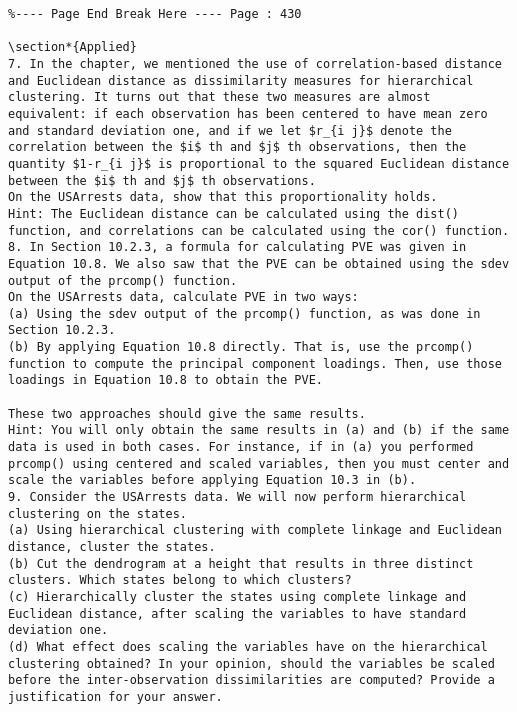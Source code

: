 \documentclass[10pt]{article}
\begin{document}
\begin{verbatim}
%---- Page End Break Here ---- Page : 430

\section*{Applied}
7. In the chapter, we mentioned the use of correlation-based distance and Euclidean distance as dissimilarity measures for hierarchical clustering. It turns out that these two measures are almost equivalent: if each observation has been centered to have mean zero and standard deviation one, and if we let $r_{i j}$ denote the correlation between the $i$ th and $j$ th observations, then the quantity $1-r_{i j}$ is proportional to the squared Euclidean distance between the $i$ th and $j$ th observations.
On the USArrests data, show that this proportionality holds.
Hint: The Euclidean distance can be calculated using the dist() function, and correlations can be calculated using the cor() function.
8. In Section 10.2.3, a formula for calculating PVE was given in Equation 10.8. We also saw that the PVE can be obtained using the sdev output of the prcomp() function.
On the USArrests data, calculate PVE in two ways:
(a) Using the sdev output of the prcomp() function, as was done in Section 10.2.3.
(b) By applying Equation 10.8 directly. That is, use the prcomp() function to compute the principal component loadings. Then, use those loadings in Equation 10.8 to obtain the PVE.

These two approaches should give the same results.
Hint: You will only obtain the same results in (a) and (b) if the same data is used in both cases. For instance, if in (a) you performed prcomp() using centered and scaled variables, then you must center and scale the variables before applying Equation 10.3 in (b).
9. Consider the USArrests data. We will now perform hierarchical clustering on the states.
(a) Using hierarchical clustering with complete linkage and Euclidean distance, cluster the states.
(b) Cut the dendrogram at a height that results in three distinct clusters. Which states belong to which clusters?
(c) Hierarchically cluster the states using complete linkage and Euclidean distance, after scaling the variables to have standard deviation one.
(d) What effect does scaling the variables have on the hierarchical clustering obtained? In your opinion, should the variables be scaled before the inter-observation dissimilarities are computed? Provide a justification for your answer.


\end{verbatim}
\end{document}

